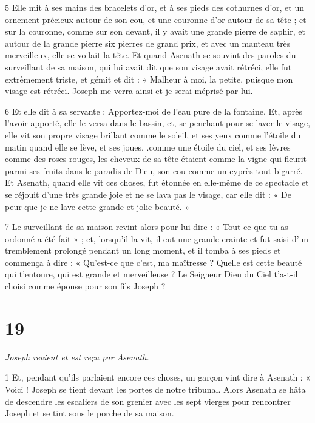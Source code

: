 \par 5 Elle mit à ses mains des bracelets d'or, et à ses pieds des cothurnes d'or, et un ornement précieux autour de son cou, et une couronne d'or autour de sa tête ; et sur la couronne, comme sur son devant, il y avait une grande pierre de saphir, et autour de la grande pierre six pierres de grand prix, et avec un manteau très merveilleux, elle se voilait la tête. Et quand Asenath se souvint des paroles du surveillant de sa maison, qui lui avait dit que son visage avait rétréci, elle fut extrêmement triste, et gémit et dit : « Malheur à moi, la petite, puisque mon visage est rétréci. Joseph me verra ainsi et je serai méprisé par lui.

\par 6 Et elle dit à sa servante : Apportez-moi de l'eau pure de la fontaine. Et, après l'avoir apporté, elle le versa dans le bassin, et, se penchant pour se laver le visage, elle vit son propre visage brillant comme le soleil, et ses yeux comme l'étoile du matin quand elle se lève, et ses joues. .comme une étoile du ciel, et ses lèvres comme des roses rouges, les cheveux de sa tête étaient comme la vigne qui fleurit parmi ses fruits dans le paradis de Dieu, son cou comme un cyprès tout bigarré. Et Asenath, quand elle vit ces choses, fut étonnée en elle-même de ce spectacle et se réjouit d'une très grande joie et ne se lava pas le visage, car elle dit : « De peur que je ne lave cette grande et jolie beauté. »

\par 7 Le surveillant de sa maison revint alors pour lui dire : « Tout ce que tu as ordonné a été fait » ; et, lorsqu'il la vit, il eut une grande crainte et fut saisi d'un tremblement prolongé pendant un long moment, et il tomba à ses pieds et commença à dire : « Qu'est-ce que c'est, ma maîtresse ? Quelle est cette beauté qui t'entoure, qui est grande et merveilleuse ? Le Seigneur Dieu du Ciel t'a-t-il choisi comme épouse pour son fils Joseph ?

\chapter{19}

\par \textit{Joseph revient et est reçu par Asenath.}

\par 1 Et, pendant qu'ils parlaient encore ces choses, un garçon vint dire à Asenath : « Voici ! Joseph se tient devant les portes de notre tribunal. Alors Asenath se hâta de descendre les escaliers de son grenier avec les sept vierges pour rencontrer Joseph et se tint sous le porche de sa maison.

